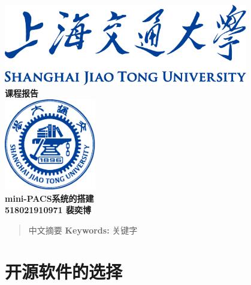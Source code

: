 \documentclass[UTF8]{ctexart}
\begin{document}

\begin{titlepage}
    \begin{center}
        \includegraphics[width=0.8\textwidth]{sjtu-name-blue.pdf}\\[1cm]
        \textsc{\Huge \bfseries 课程报告}\\[1.5cm]
        \includegraphics[width=0.3\textwidth]{sjtu-badge-blue.pdf}\\[0.5cm]

        \Huge \bfseries{mini-PACS系统的搭建}\\[1cm]
        \Large \bfseries{518021910971 裴奕博}
    \end{center}
\end{titlepage}
\tableofcontents
\newpage

\begin{abstract}
    中文摘要
    \textbf{Keywords:} 关键字
\end{abstract}
\section{开源软件的选择}
\end{document}

